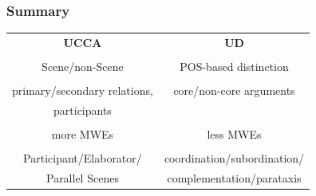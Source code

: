 \documentclass[t,handout,xcolor={svgnames}]{beamer}
\begin{document}
\begin{frame}
\frametitle{Summary}
\centering
\begin{tabular}{cc}
\bf UCCA & \bf UD \\\\
Scene/non-Scene & POS-based distinction \\\\
primary/secondary relations, & core/non-core arguments \\
participants & \\\\
more MWEs & less MWEs \\\\
Participant/Elaborator/ & coordination/subordination/ \\
Parallel Scenes & complementation/parataxis
\end{tabular}


\end{frame}
\end{document}
